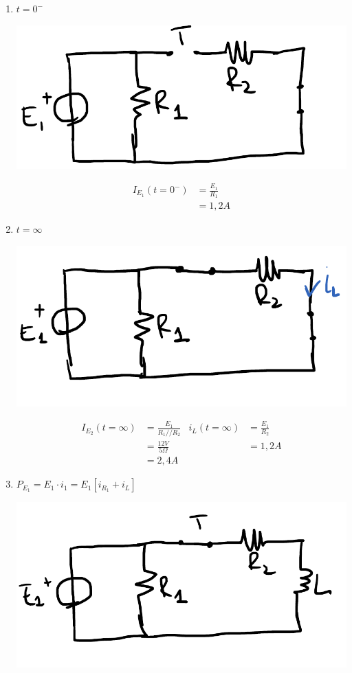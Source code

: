 \documentclass{article}
\begin{document}
\begin{enumerate}[label=\protect\circled{\arabic*}]
    \item $t=0^-$
    \begin{center}
        \includegraphics[scale=0.4]{Image/Es_2_Trans_1.png}
    \end{center}
    \begin{align*}
        I_{E_1}(t=0^-) &=\frac{E_1}{R_1} \\
        &=1,2A
    \end{align*}
    \item $t=\infty$
    \begin{center}
        \includegraphics[scale=0.4]{Image/Es_2_Trans_2.png}
    \end{center}
    \begin{align*}
        I_{E_2}(t=\infty) &= \frac{E_1}{R_1//R_2} & i_L(t=\infty) &= \frac{E_1}{R_2}\\
        &=\frac{12V}{5\Omega} & &=1,2A\\
        &= 2,4 A
    \end{align*}
    \item $P_{E_1} = E_1 \cdot i_1 = E_1[i_{R_1}+i_L]$
    \begin{center}
        \includegraphics[scale=0.4]{Image/Es_2_Trans_3.png}

\end{center}
\end{enumerate}
\end{document}
